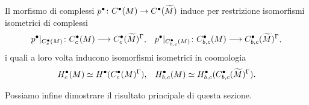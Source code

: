\begin{lemma}
Il morfismo di complessi $\map{p^\bul}{C^\bul(M)}{C^\bul(\widetilde M)}$ induce per restrizione isomorfismi  isometrici di complessi
\begin{align*}
\map{p^\bul|_{C^\bul_c(M)}}{C^\bul_c(M)}{C^\bul_c(\widetilde M)^\Gamma},&&\map{p^\bul|_{C^\bul_{b,c}(M)}}{C^\bul_{b,c}(M)}{C^\bul_{b,c}(\widetilde M)^\Gamma},
\end{align*}
i quali a loro volta inducono isomorfismi isometrici in coomologia
\begin{align*}
H^\bullet_c(M)\simeq H^\bullet(C^\bullet_c(M)^\Gamma),&&H^\bullet_{b,c}(M)\simeq H^\bullet_{b,c}(C^\bullet_{b,c}(\widetilde M)^\Gamma).
\end{align*}
\end{lemma}

Possiamo infine dimostrare il risultato principale di questa sezione.

